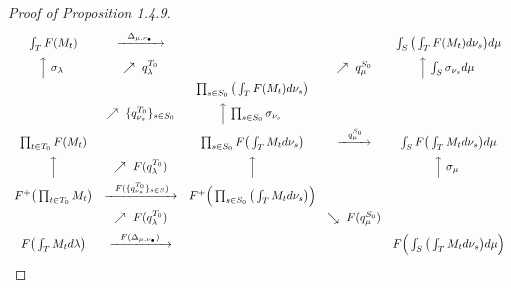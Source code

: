 \documentclass[11pt]{article}
\theoremstyle{plain}
\begin{document}
\begin{proof}[Proof of Proposition 1.4.9]

\[
\begin{array}{ccccc}
\int_T F(M_t) & \xrightarrow{\ \ \Delta_{\mu,\nu_\bullet}\ \ } & & & \int_S\big(\int_T F(M_t)d\nu_s\big)d\mu\\[6pt]
\Big\uparrow{\ \sigma_\lambda\ } & \nearrow{\ q_\lambda^{T_0}} & & \nearrow{\ q_\mu^{S_0}} & \Big\uparrow{\ \int_S \sigma_{\nu_s}d\mu\ }\\[6pt]
& & \prod_{s \in S_0}\big(\int_T F(M_t)d\nu_s\big) & & \\[6pt]
& \nearrow{\ \{q_{\nu_s}^{T_0}\}_{s \in S_0}} & \Big\uparrow{\ \prod_{s \in S_0} \sigma_{\nu_s}\ } & & \\[6pt]
\prod_{t \in T_0} F(M_t) & & \prod_{s \in S_0} F\big(\int_T M_t d\nu_s\big) & \xrightarrow{\ \ q_\mu^{S_0}\ } & \int_S F\big(\int_T M_t d\nu_s\big)d\mu\\[6pt]
\Big\uparrow & \nearrow{\ F(q_\lambda^{T_0})} & \Big\uparrow & & \Big\uparrow{\ \sigma_\mu\ }\\[6pt]
F^+\big(\prod_{t \in T_0} M_t\big) & \xrightarrow{\ \ F(\{q_{\nu_s}^{T_0}\}_{s \in S})\ } & F^+\Big(\prod_{s \in S_0}\big(\int_T M_t d\nu_s\big)\Big) & & \\[6pt]
& \nearrow{\ F(q_\lambda^{T_0})} & & \searrow{\ F(q_\mu^{S_0})} & \\[6pt]
F\big(\int_T M_t d\lambda\big) & \xrightarrow{\ \ F(\Delta_{\mu,\nu_\bullet})\ \ } & & & F\Big(\int_S\big(\int_T M_t d\nu_s\big)d\mu\Big)
\end{array}
\]


\end{proof}
\end{document}

